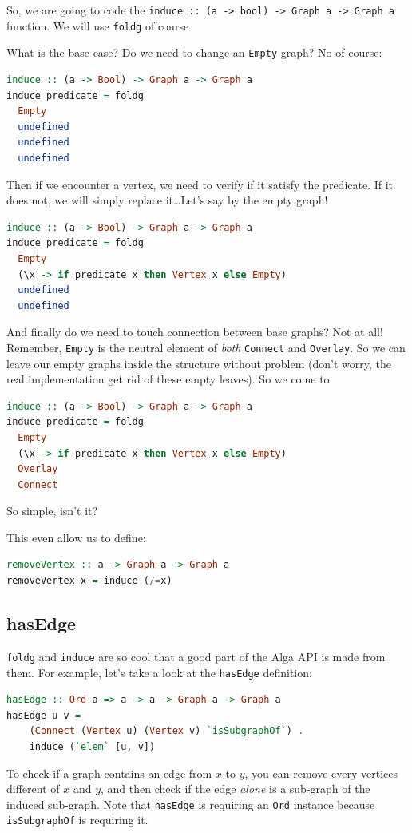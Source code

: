 \documentclass[10pt,a4paper]{article}
\begin{document}
So, we are going to code the \verb|induce :: (a -> bool) -> Graph a -> Graph a| function. We will use \verb|foldg| of course

What is the base case? Do we need to change an \verb|Empty| graph? No of course:

\begin{lstlisting}[language=Haskell, frame=single]
induce :: (a -> Bool) -> Graph a -> Graph a
induce predicate = foldg
  Empty
  undefined
  undefined
  undefined
\end{lstlisting}

Then if we encounter a vertex, we need to verify if it satisfy the predicate. If it does not, we will simply replace it\ldots  Let's say by the empty graph!

\begin{lstlisting}[language=Haskell, frame=single]
induce :: (a -> Bool) -> Graph a -> Graph a
induce predicate = foldg
  Empty
  (\x -> if predicate x then Vertex x else Empty)
  undefined
  undefined
\end{lstlisting}

And finally do we need to touch connection between base graphs? Not at all! Remember, \verb|Empty| is the neutral element of \emph{both} \verb|Connect| and \verb|Overlay|. So we can leave our empty graphs inside the structure without problem (don't worry, the real implementation get rid of these empty leaves). So we come to:

\begin{lstlisting}[language=Haskell, frame=single]
induce :: (a -> Bool) -> Graph a -> Graph a
induce predicate = foldg
  Empty
  (\x -> if predicate x then Vertex x else Empty)
  Overlay
  Connect
\end{lstlisting}

So simple, isn't it?

This even allow us to define:

\begin{lstlisting}[language=Haskell, frame=single]
removeVertex :: a -> Graph a -> Graph a
removeVertex x = induce (/=x)
\end{lstlisting}

\subsection{hasEdge}
\verb|foldg| and \verb|induce| are so cool that a good part of the Alga API is made from them. For example, let's take a look at the \verb|hasEdge| definition:
\begin{lstlisting}[language=Haskell, frame=single]
hasEdge :: Ord a => a -> a -> Graph a -> Graph a
hasEdge u v =
	(Connect (Vertex u) (Vertex v) `isSubgraphOf`) .
	induce (`elem` [u, v])
\end{lstlisting}
To check if a graph contains an edge from $x$ to $y$, you can remove every vertices different of $x$ and $y$, and then check if the edge \emph{alone} is a sub-graph of the induced sub-graph.
Note that \verb|hasEdge| is requiring an \verb|Ord| instance because \verb|isSubgraphOf| is requiring it.
\end{document}
